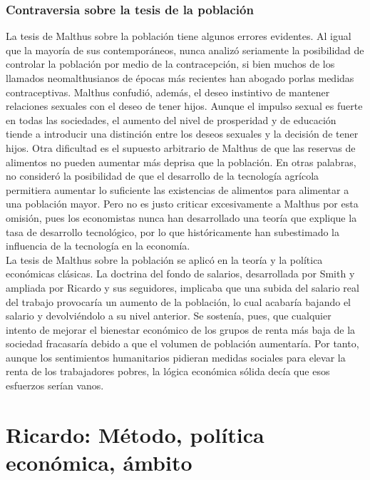 \documentclass[10pt]{book}
\begin{document}
\subsubsection*{Contraversia sobre la tesis de la población}
La tesis de Malthus sobre la población tiene algunos errores evidentes. Al igual que la mayoría de sus contemporáneos, nunca analizó seriamente la posibilidad de controlar la población por medio de la contracepción, si bien muchos de los llamados neomalthusianos de épocas más recientes han abogado porlas medidas contraceptivas. Malthus confudió, además, el deseo instintivo de mantener relaciones sexuales con el deseo de tener hijos. Aunque el impulso sexual es fuerte en todas las sociedades, el aumento del nivel de prosperidad y de educación tiende a introducir una distinción entre los deseos sexuales y la decisión de tener hijos. Otra dificultad es el supuesto arbitrario de Malthus de que las reservas de alimentos no pueden aumentar más deprisa que la población. En otras palabras, no consideró la posibilidad de que el desarrollo de la tecnología agrícola permitiera aumentar lo suficiente las existencias de alimentos para alimentar a una población mayor. Pero no es justo criticar excesivamente a Malthus por esta omisión, pues los economistas nunca han desarrollado una teoría que explique la tasa de desarrollo tecnológico, por lo que históricamente han subestimado la influencia de la tecnología en la economía.\\
La tesis de Malthus sobre la población se aplicó en la teoría y la política económicas clásicas. La doctrina del fondo de salarios, desarrollada por Smith y ampliada por Ricardo y sus seguidores, implicaba que una subida del salario real del trabajo provocaría un aumento de la población, lo cual acabaría bajando el salario y devolviéndolo a su nivel anterior. Se sostenía, pues, que cualquier intento de mejorar el bienestar económico de los grupos de renta más baja de la sociedad fracasaría debido a que el volumen de población aumentaría. Por tanto, aunque los sentimientos humanitarios pidieran medidas sociales para elevar la renta de los trabajadores pobres, la lógica económica sólida decía que esos esfuerzos serían vanos.

\section*{Ricardo: Método, política económica, ámbito}
\end{document}
